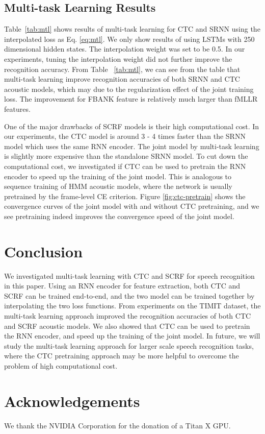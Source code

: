 \documentclass[a4paper]{article}
\begin{document}
\subsection{Multi-task Learning Results}

Table~\ref{tab:mtl} shows results of multi-task learning for CTC and SRNN using the interpolated loss as Eq. \eqref{eq:mtl}. We only show results of using LSTMs with 250 dimensional hidden states. The interpolation weight was set to be 0.5. In our experiments, tuning the interpolation weight did not further improve the recognition accuracy. From Table ~\ref{tab:mtl}, we can see from the table that multi-task learning improve recognition accuracies of both SRNN and CTC acoustic models, which may due to the regularization effect of the joint training loss. The improvement for FBANK feature is relatively much larger than fMLLR features.  

One of the major drawbacks of SCRF models is their high computational cost. In our experiments, the CTC model is around 3 - 4 times faster than the SRNN model which uses the same RNN encoder. The joint model by multi-task learning is slightly more expensive than the standalone SRNN model. To cut down the computational cost, we investigated if CTC can be used to pretrain the RNN encoder to speed up the training of the joint model. This is analogous to sequence training of HMM acoustic models, where the network is usually pretrained by the frame-level CE criterion. Figure \ref{fig:ctc-pretrain} shows the convergence curves of the joint model with and without CTC pretraining, and we see  pretraining indeed improves the convergence speed of the joint model. %
 

\section{Conclusion}

We investigated multi-task learning with CTC and SCRF for speech recognition in this paper. Using an RNN encoder for feature extraction, both CTC and SCRF can be trained end-to-end, and the two model can be trained together by interpolating the two loss functions. From experiments on the TIMIT dataset, the multi-task learning approach improved the recognition accuracies of both CTC and SCRF acoustic models. We also showed that CTC can be used to pretrain the RNN encoder, and speed up the training of the joint model. In future, we will study the multi-task learning approach for larger scale speech recognition tasks, where the CTC pretraining approach may be more helpful to overcome the problem of high computational cost. 


\section{Acknowledgements}

We thank the NVIDIA Corporation for the donation of a Titan X GPU.



\end{document}
